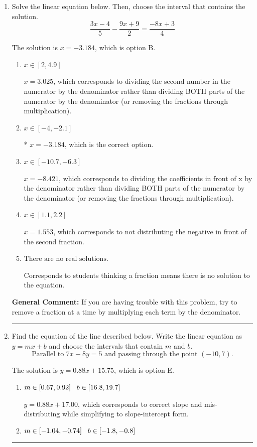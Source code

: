 \documentclass{extbook}[14pt]
\newcommand{\litem}[1]{\item #1

\rule{\textwidth}{0.4pt}}
\begin{document}
\begin{enumerate}\litem{
Solve the linear equation below. Then, choose the interval that contains the solution.
\[ \frac{3x -4}{5} - \frac{9x + 9}{2} = \frac{-8x + 3}{4} \]

The solution is \( x = -3.184 \), which is option B.\begin{enumerate}[label=\Alph*.]
\item \( x \in [2, 4.9] \)

 $x = 3.025$, which corresponds to dividing the second number in the numerator by the denominator rather than dividing BOTH parts of the numerator by the denominator (or removing the fractions through multiplication).
\item \( x \in [-4, -2.1] \)

* $x = -3.184$, which is the correct option.
\item \( x \in [-10.7, -6.3] \)

 $x = -8.421$, which corresponds to dividing the coefficients in front of x by the denominator rather than dividing BOTH parts of the numerator by the denominator (or removing the fractions through multiplication).
\item \( x \in [1.1, 2.2] \)

 $x = 1.553$, which corresponds to not distributing the negative in front of the second fraction.
\item \( \text{There are no real solutions.} \)

Corresponds to students thinking a fraction means there is no solution to the equation.
\end{enumerate}

\textbf{General Comment:} If you are having trouble with this problem, try to remove a fraction at a time by multiplying each term by the denominator.
}
\litem{
Find the equation of the line described below. Write the linear equation as $ y=mx+b $ and choose the intervals that contain $m$ and $b$.
\[ \text{Parallel to } 7 x - 8 y = 5 \text{ and passing through the point } (-10, 7). \]

The solution is \( y = 0.88x + 15.75 \), which is option E.\begin{enumerate}[label=\Alph*.]
\item \( m \in [0.67, 0.92] \hspace*{3mm} b \in [16.8, 19.7] \)

 $y = 0.88x + 17.00$, which corresponds to correct slope and mis-distributing while simplifying to slope-intercept form.
\item \( m \in [-1.04, -0.74] \hspace*{3mm} b \in [-1.8, -0.8] \)


\end{enumerate}}
\end{enumerate}
\end{document}
